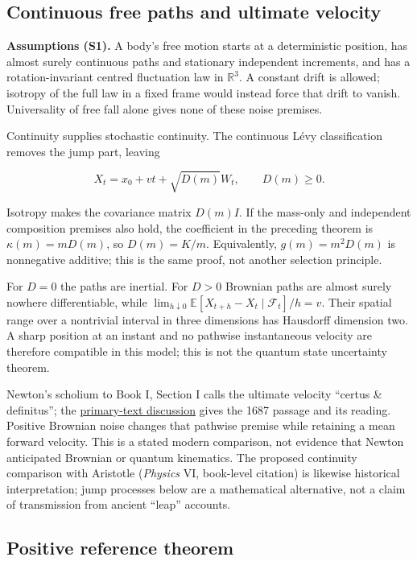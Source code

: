 \documentclass[11pt,a4paper]{article}
\begin{document}
\hypertarget{continuous-free-paths-and-ultimate-velocity}{%
\subsection{Continuous free paths and ultimate
velocity}\label{continuous-free-paths-and-ultimate-velocity}}

\textbf{Assumptions (S1).} A body's free motion starts at a
deterministic position, has almost surely continuous paths and
stationary independent increments, and has a rotation-invariant centred
fluctuation law in \(\mathbb R^3\). A constant drift is allowed;
isotropy of the full law in a fixed frame would instead force that drift
to vanish. Universality of free fall alone gives none of these noise
premises.

Continuity supplies stochastic continuity. The continuous Lévy
classification removes the jump part, leaving

\[X_t=x_0+vt+\sqrt{D(m)}W_t,\qquad D(m)\ge0.\]

Isotropy makes the covariance matrix \(D(m)I\). If the mass-only and
independent composition premises also hold, the coefficient in the
preceding theorem is \(\kappa(m)=mD(m)\), so \(D(m)=K/m\). Equivalently,
\(g(m)=m^2D(m)\) is nonnegative additive; this is the same proof, not
another selection principle.

For \(D=0\) the paths are inertial. For \(D>0\) Brownian paths are
almost surely nowhere differentiable, while
\(\lim_{h\downarrow0}\mathbb E[X_{t+h}-X_t\mid\mathcal F_t]/h=v\). Their
spatial range over a nontrivial interval in three dimensions has
Hausdorff dimension two. A sharp position at an instant and no pathwise
instantaneous velocity are therefore compatible in this model; this is
not the quantum state uncertainty theorem.

Newton's scholium to Book I, Section I calls the ultimate velocity
``certus \& definitus''; the
\href{principia-fifth-postulate.md}{primary-text discussion} gives the
1687 passage and its reading. Positive Brownian noise changes that
pathwise premise while retaining a mean forward velocity. This is a
stated modern comparison, not evidence that Newton anticipated Brownian
or quantum kinematics. The proposed continuity comparison with Aristotle
(\emph{Physics} VI, book-level citation) is likewise historical
interpretation; jump processes below are a mathematical alternative, not
a claim of transmission from ancient ``leap'' accounts.

\hypertarget{positive-reference-theorem}{%
\subsection{Positive reference
theorem}\label{positive-reference-theorem}}
\end{document}
